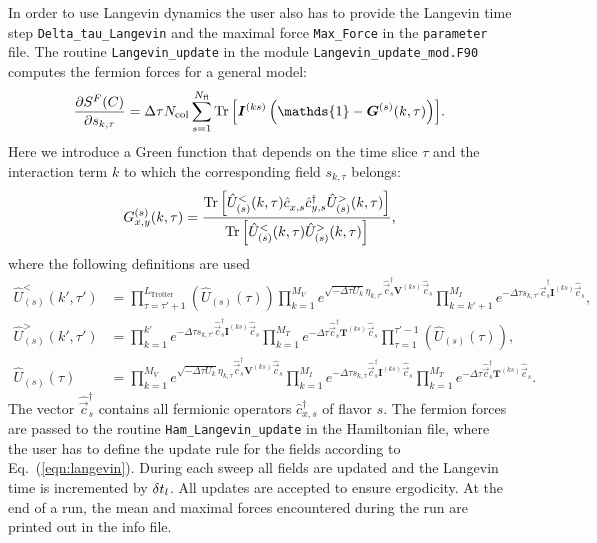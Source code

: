 In order to use Langevin dynamics the user also has to provide the Langevin time step \texttt{Delta\_tau\_Langevin} and the maximal force \texttt{Max\_Force} in the \texttt{parameter} file. The routine  \texttt{Langevin\_update} in the module \texttt{Langevin\_update\_mod.F90}   computes the fermion forces  for a  general model:
\begin{equation}
 \frac { \partial S^F(C)}{\partial s_{k,\tau} } 
 	= \Delta \tau {N_{\mathrm{col}}} \sum\limits_{s=1}^{N_{\mathrm{fl}}} \Tr{\left[ \bm{I}^{(ks)}\left(\mathds{1} - \bm{G}^{(s)}(k,\tau) \right) \right]} .
\end{equation}
Here we introduce a Green function that depends on the time slice $\tau$  and the interaction term $k$ to which the corresponding field $s_{k,\tau}$ belongs:
\begin{equation}\label{eqn:green_langevin}
G_{x,y}^{(s)}(k,\tau) = \frac{\Tr{\left[ \hat{U}_{(s)}^{<}(k,\tau) \hat{c}_{x,s}^{\phantom\dagger} \hat{c}_{y,s}^{\dagger} \hat{U}_{(s)}^{>}(k,\tau) \right]} }
{\Tr{\left[ \hat{U}_{(s)}^{<}(k,\tau)\hat{U}_{(s)}^{>}(k,\tau) \right]}},
\end{equation}
where the following definitions are used
\begin{align}
 \hat{U}_{(s)}^{<}(k',\tau') &= \prod_{\tau=\tau'+1}^{L_{\text{Trotter}}}  \left( \hat{U}_{(s)}(\tau) \right)
  \prod_{k=1}^{M_V} e^{\sqrt{-\Delta\tau U_k}  \eta_{k,\tau'} \hat{\vec{c}}_{s}^{\dagger} \bm{V}^{(ks)} \hat{\vec{c}}_{s}^{\phantom\dagger}}
\prod_{k=k'+1}^{M_I} e^{-\Delta\tau s_{k,\tau'} \hat{\vec{c}}_{s}^{\dagger} \bm{I}^{(ks)} \hat{\vec{c}}_{s}^{\phantom\dagger}}, \\
 \hat{U}_{(s)}^{>}(k',\tau') &= \prod_{k=1}^{k'} e^{-\Delta \tau s_{k,\tau'}  \hat{\vec{c}}_{s}^{\dagger} \bm{I}^{(ks)} \hat{\vec{c}}_{s}^{\phantom\dagger}}
  \prod_{k=1}^{M_T}   e^{-\Delta\tau  \hat{\vec{c}}_{s}^{\dagger} \bm{T}^{(ks)} \hat{\vec{c}}_{s}^{\phantom\dagger}} 
  \prod_{\tau=1}^{\tau'-1}  \left( \hat{U}_{(s)}(\tau) \right), \\
  \hat{U}_{(s)}(\tau) &= \prod_{k=1}^{M_V} e^{\sqrt{-\Delta\tau U_k}  \eta_{k,\tau} \hat{\vec{c}}_{s}^{\dagger} \bm{V}^{(ks)} \hat{\vec{c}}_{s}^{\phantom\dagger}} 
  \prod_{k=1}^{M_I} e^{-\Delta\tau s_{k,\tau} \hat{\vec{c}}_{s}^{\dagger} \bm{I}^{(ks)} \hat{\vec{c}}_{s}^{\phantom\dagger}}
    \prod_{k=1}^{M_T}   e^{-\Delta\tau  \hat{\vec{c}}_{s}^{\dagger} \bm{T}^{(ks)} \hat{\vec{c}}_{s}^{\phantom\dagger}} .
\end{align}
The vector $\hat{\vec{c}}_s^{\dagger}$ contains all fermionic operators $\hat{c}_{x,s}^{\dagger}$ of flavor $s$.
The fermion forces are passed to the routine \texttt{Ham\_Langevin\_update} in the Hamiltonian file, where the user has to define the update rule for the fields according to Eq.~(\ref{eqn:langevin}). During each sweep all fields are updated and the Langevin time is incremented by $\delta t_{l}$. All updates are accepted to ensure ergodicity. At the end of a run, the mean and maximal forces encountered during the run are printed out in the info file.


